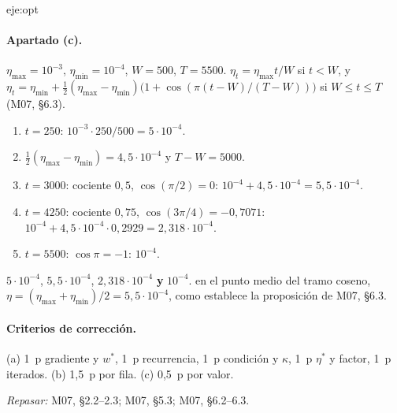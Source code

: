 \begin{solucion}{eje:opt}
\paragraph{Apartado (c).}
\datos $\eta_{\max}=10^{-3}$, $\eta_{\min}=10^{-4}$, $W=500$, $T=5500$.
\planteamiento $\eta_t=\eta_{\max}t/W$ si $t<W$, y $\eta_t=\eta_{\min}+\tfrac12(\eta_{\max}-\eta_{\min})\bigl(1+\cos(\pi(t-W)/(T-W))\bigr)$ si $W\le t\le T$ (M07, §6.3).
\pasos
\begin{enumerate}[label=\arabic*.]
  \item $t=250$: $10^{-3}\cdot 250/500=5\cdot 10^{-4}$.
  \item $\tfrac12(\eta_{\max}-\eta_{\min})=4{,}5\cdot 10^{-4}$ y $T-W=5000$.
  \item $t=3000$: cociente $0{,}5$, $\cos(\pi/2)=0$: $10^{-4}+4{,}5\cdot 10^{-4}=5{,}5\cdot 10^{-4}$.
  \item $t=4250$: cociente $0{,}75$, $\cos(3\pi/4)=-0{,}7071$: $10^{-4}+4{,}5\cdot 10^{-4}\cdot 0{,}2929=2{,}318\cdot 10^{-4}$.
  \item $t=5500$: $\cos\pi=-1$: $10^{-4}$.
\end{enumerate}
\resultado $5\cdot 10^{-4}$, $5{,}5\cdot 10^{-4}$, $2{,}318\cdot 10^{-4}$ \textbf{y} $10^{-4}$.
\comprobacion en el punto medio del tramo coseno, $\eta=(\eta_{\max}+\eta_{\min})/2=5{,}5\cdot 10^{-4}$, como establece la proposición de M07, §6.3.

\paragraph{Criterios de corrección.} (a) 1~p gradiente y $w^{*}$, 1~p recurrencia, 1~p condición y $\kappa$, 1~p $\eta^{*}$ y factor, 1~p iterados. (b) 1,5~p por fila. (c) 0,5~p por valor.

\textit{Repasar:} M07, §2.2--2.3; M07, §5.3; M07, §6.2--6.3.
\end{solucion}

